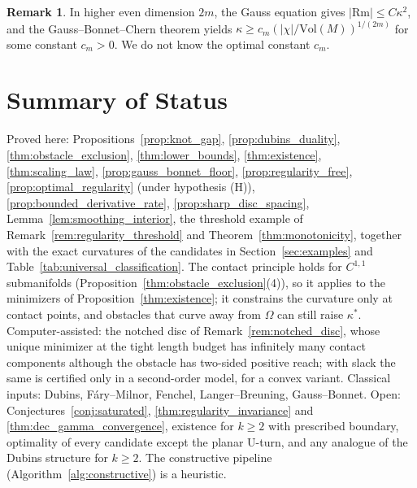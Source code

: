 \documentclass[11pt,reqno]{amsart}
\theoremstyle{definition}
\newtheorem{remark}[theorem]{Remark}
\numberwithin{equation}{section}
\begin{document}
\begin{remark}
In higher even dimension $2m$, the Gauss equation gives $|\mathrm{Rm}| \le C\kappa^2$, and the Gauss--Bonnet--Chern theorem yields $\kappa \ge c_m (|\chi|/\mathrm{Vol}(M))^{1/(2m)}$ for some constant $c_m > 0$. We do not know the optimal constant $c_m$.
\end{remark}

\section{Summary of Status}
\label{sec:status}
Proved here: Propositions~\ref{prop:knot_gap}, \ref{prop:dubins_duality}, \ref{thm:obstacle_exclusion}, \ref{thm:lower_bounds}, \ref{thm:existence}, \ref{thm:scaling_law}, \ref{prop:gauss_bonnet_floor}, \ref{prop:regularity_free}, \ref{prop:optimal_regularity} (under hypothesis (H)), \ref{prop:bounded_derivative_rate}, \ref{prop:sharp_disc_spacing}, Lemma~\ref{lem:smoothing_interior}, the threshold example of Remark~\ref{rem:regularity_threshold} and Theorem~\ref{thm:monotonicity}, together with the exact curvatures of the candidates in Section~\ref{sec:examples} and Table~\ref{tab:universal_classification}. The contact principle holds for $C^{1,1}$ submanifolds (Proposition~\ref{thm:obstacle_exclusion}(4)), so it applies to the minimizers of Proposition~\ref{thm:existence}; it constrains the curvature only at contact points, and obstacles that curve away from $\Omega$ can still raise $\kappa^*$. Computer-assisted: the notched disc of Remark~\ref{rem:notched_disc}, whose unique minimizer at the tight length budget has infinitely many contact components although the obstacle has two-sided positive reach; with slack the same is certified only in a second-order model, for a convex variant. Classical inputs: Dubins, F\'ary--Milnor, Fenchel, Langer--Breuning, Gauss--Bonnet. Open: Conjectures~\ref{conj:saturated}, \ref{thm:regularity_invariance} and \ref{thm:dec_gamma_convergence}, existence for $k \ge 2$ with prescribed boundary, optimality of every candidate except the planar U-turn, and any analogue of the Dubins structure for $k \ge 2$. The constructive pipeline (Algorithm~\ref{alg:constructive}) is a heuristic.


\end{document}

